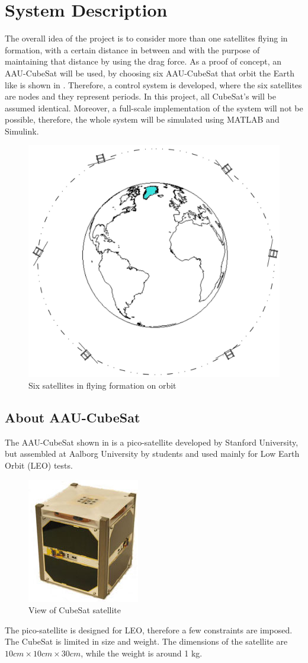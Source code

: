 \chapter{System Description}\label{chap:systemDescribtion}
The overall idea of the project is to consider more than one satellites flying in formation, with a certain distance in between and with the purpose of maintaining that distance by using the drag force. As a proof of concept, an AAU-CubeSat will be used, by choosing six AAU-CubeSat that orbit the Earth like is shown in  . Therefore, a control system is developed, where the six satellites are nodes and they represent periods. %
 In this project, all CubeSat's will be assumed identical. Moreover, a full-scale implementation of the system will not be possible, therefore, the whole system will be simulated using MATLAB and Simulink. 
%
\begin{figure}[H]
	\centering
	\includegraphics[width=0.7\linewidth]{figures/sat_form}
	\caption{Six satellites in flying formation on orbit}
	\label{fig:1}
\end{figure}
%
\section{About AAU-CubeSat}
The AAU-CubeSat shown in  is a pico-satellite developed by Stanford University, but assembled at Aalborg University by students and used mainly for Low Earth Orbit (LEO)  tests.
\begin{figure}[H]
	\centering
	\includegraphics[width=0.3\linewidth]{figures/cub}
	\caption{View of CubeSat satellite \cite{cs}}
	\label{fig:pico}
\end{figure}
The pico-satellite is designed for LEO, therefore a few constraints are imposed. The CubeSat is limited in size and weight. The dimensions of the satellite are $10cm\times10cm\times30cm$, while the weight is around 1 kg.\cite{CDS}

